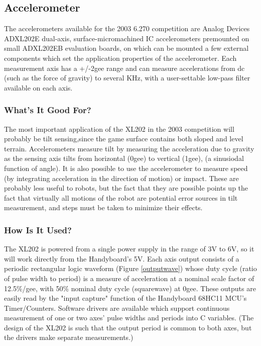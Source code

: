 \documentclass{article}
\begin{document}
\subsection{Accelerometer}

The accelerometers available for the 2003 6.270 competition are Analog
Devices ADXL202E dual-axis, surface-micromachined IC accelerometers
premounted on small ADXL202EB evaluation boards, on which can be
mounted a few external components which set the application properties
of the accelerometer.  Each measurement axis has a +/-2gee range and
can measure accelerations from dc (such as the force of gravity) to
several KHz, with a user-settable low-pass filter available on each
axis.

\subsubsection{What's It Good For?}

The most important application of the XL202 in the 2003 competition
will probably be tilt sensing,since the game surface contains both
sloped and level terrain. Accelerometers measure tilt by measuring the
acceleration due to gravity as the sensing axis tilts from horizontal
(0gee) to vertical (1gee), (a sinusiodal function of angle).  It is
also possible to use the accelerometer to measure speed (by
integrating acceleration in the direction of motion) or impact.  These
are probably less useful to robots, but the fact that they are
possible points up the fact that virtually all motions of the robot
are potential error sources in tilt measurement, and steps must be
taken to minimize their effects.

\subsubsection{How Is It Used?}

The XL202 is powered from a single power supply in the range of 3V to
6V, so it will work directly from the Handyboard's 5V.  Each axis
output consists of a periodic rectangular logic waveform (Figure
\ref{outputwave}) 
whose duty cycle (ratio of pulse width to period) is a measure of
acceleration at a nominal scale factor of 12.5\%/gee, with 50\% nominal
duty cycle (squarewave) at 0gee.  These outputs are easily read by the
"input capture" function of the Handyboard 68HC11 MCU's
Timer/Counters.  Software drivers are available which support
continuous measurement of one or two axes' pulse widths and periods
into C variables.  (The design of the XL202 is such that the output
period is common to both axes, but the drivers make separate
measurements.)
\end{document}
